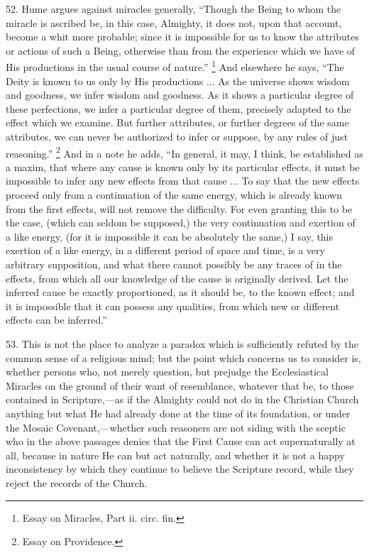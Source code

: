 52.
Hume argues against miracles generally, ``Though the Being to whom
the miracle is ascribed be, in this case, Almighty, it does not, upon
that account, become a whit more probable; since it is impossible for
us to know the attributes or actions of such a Being, otherwise than
from the experience which we have of His productions in the usual
course of nature.'' \footnote{Essay on Miracles, Part ii. circ. fin.} And elsewhere he says, ``The Deity
is known to us only by His productions ... As the universe shows
wisdom and goodness, we infer wisdom and goodness. As it shows a
particular degree of these perfections, we infer a particular degree
of them, precisely adapted to the effect which we examine. But further
attributes, or further degrees of the same attributes, we can never be
authorized to infer or suppose, by any rules of just reasoning.'' \footnote{Essay on Providence.} And in a note he adds, ``In general, it may, I think, be
established as a maxim, that where any cause is known only by its
particular effects, it must be impossible to infer any new effects
from that cause ... To say that the new effects proceed only from a
continuation of the same energy, which is already known from the first
effects, will not remove the difficulty. For even granting this to be
the case, (which can seldom be supposed,) the very continuation and
exertion of a like energy, (for it is impossible it can be absolutely
the same,) I say, this exertion of a like energy, in a different
period of space and time, is a very arbitrary supposition, and what
there cannot possibly be any traces of in the effects, from
which all our knowledge of the cause is originally derived. Let the
inferred cause be exactly proportioned, as it should be, to the known
effect; and it is impossible that it can possess any qualities, from
which new or different effects can be inferred.''

53.
This is not the place to analyze a paradox which is sufficiently
refuted by the common sense of a religious mind; but the point which
concerns us to consider is, whether persons who, not merely question,
but prejudge the Ecclesiastical Miracles on the ground of their want
of resemblance, whatever that be, to those contained in
Scripture,—as if the Almighty could not do in the Christian Church
anything but what He had already done at the time of its foundation,
or under the Mosaic Covenant,—whether such reasoners are not siding
with the sceptic who in the above passages denies that the First Cause
can act supernaturally at all, because in nature He can but act
naturally, and whether it is not a happy inconsistency by which they
continue to believe the Scripture record, while they reject the
records of the Church.

